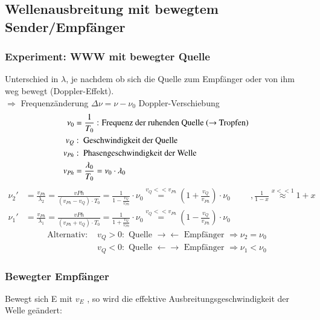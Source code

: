 \subsection{Wellenausbreitung mit bewegtem Sender/Empfänger} \enter
\subsubsection{Experiment: WWW mit bewegter Quelle}
\bild
Unterschied in $ \lambda $, je nachdem ob sich die Quelle zum Empfänger oder von ihm weg bewegt (Doppler-Effekt).\\
$ \Rightarrow $ Frequenzänderung $ \Delta\nu = \nu-\nu_0 $ Doppler-Verschiebung \\
\begin{align*}
\nu_0 &= \frac{1}{T_0} \text{ : Frequenz der ruhenden Quelle ($ \rightarrow $ Tropfen) }\\
v_Q &: \text{ Geschwindigkeit der Quelle }\\
v_{Ph} &: \text{ Phasengeschwindigkeit der Welle }\\
v_{Ph} &= \frac{\lambda_0}{T_0} = \nu_0 \cdot \lambda_0
\end{align*}
\begin{align*}
\nu_2'&=\frac{v_{Ph}}{\lambda_2} = \frac{v{Ph}}{(v_{Ph}-v_Q)\cdot T_0} = \frac{1}{1-\frac{v_Q}{v_{Ph}}} \cdot \nu_0 \overset{v_Q<<v_{Ph}}{=} (1+\frac{v_Q}{v_{Ph}}) \cdot \nu_0 \hspace{1cm}, \frac{1}{1-x} \overset{x<<1}{\approx} 1+x \\
\nu_1'&=\frac{v_{Ph}}{\lambda_1} = \frac{v{Ph}}{(v_{Ph}+v_Q)\cdot T_0} = \frac{1}{1+\frac{v_Q}{v_{Ph}}} \cdot \nu_0 \overset{v_Q<<v_{Ph}}{=} (1-\frac{v_Q}{v_{Ph}}) \cdot \nu_0
\end{align*}
\begin{align*}
\text{Alternativ: } &v_Q > 0 : \text{ Quelle } \rightarrow \leftarrow \text{ Empfänger } \Rightarrow \nu_2 = \nu_0\\
&v_Q<0: \text{ Quelle } \leftarrow \rightarrow \text{ Empfänger } \Rightarrow \nu_1<\nu_0
\end{align*}
\subsubsection{Bewegter Empfänger}
Bewegt sich E mit $ v_E $ , so wird die effektive Ausbreitungsgeschwindigkeit der Welle geändert:\\

